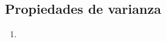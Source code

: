 \subsection{Propiedades de varianza}
\begin{Teo}
    \begin{enumerate}
        \item 
    \end{enumerate}
\end{Teo}